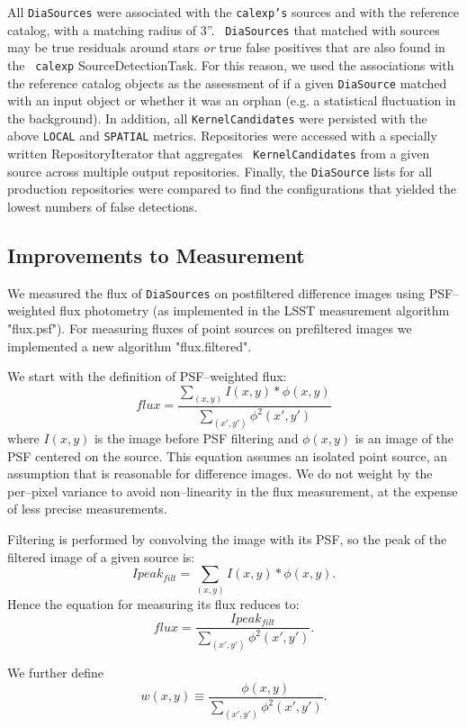 \documentclass[prd, nofootinbib, floatfix, 11pt,tightenlines,times]{article}
\begin{document}
All {\tt DiaSources} were associated with the {\tt calexp's} sources
and with the reference catalog, with a matching radius of 3''.  {\tt
  DiaSources} that matched with sources may be true residuals around
stars {\it or} true false positives that are also found in the {\tt
  calexp} SourceDetectionTask.  For this reason, we used the
associations with the reference catalog objects as the assessment of
if a given {\tt DiaSource} matched with an input object or whether it
was an orphan (e.g. a statistical fluctuation in the background).  In
addition, all {\tt KernelCandidates} were persisted with the above
{\tt LOCAL} and {\tt SPATIAL} metrics.  Repositories were accessed
with a specially written RepositoryIterator that aggregates {\tt
  KernelCandidates} from a given source across multiple output
repositories.  Finally, the {\tt DiaSource} lists for all production
repositories were compared to find the configurations that yielded the
lowest numbers of false detections.

\subsection{Improvements to Measurement \label{sec-meas}}

We measured the flux of {\tt DiaSources} on postfiltered difference images
using PSF--weighted flux photometry (as implemented in the LSST
measurement algorithm "flux.psf").  For measuring fluxes of point
sources on prefiltered images we implemented a new algorithm
"flux.filtered".

We start with the definition of PSF--weighted flux:
%
\[flux = \frac{\sum_{(x,y)}I(x,y) * \phi(x,y)}{\sum_{(x',y')}\phi^2(x',y')}\]
%
where $I(x,y)$ is the image before PSF filtering and $\phi(x,y)$ is an
image of the PSF centered on the source. This equation assumes an
isolated point source, an assumption that is reasonable for difference
images.  We do not weight by the per--pixel variance to avoid
non--linearity in the flux measurement, at the expense of less precise
measurements.

Filtering is performed by convolving the image with its PSF, so the
peak of the filtered image of a given source is:
%
\[Ipeak_{filt} = \sum_{(x,y)}I(x,y) * \phi(x,y).\]
%
Hence the equation for measuring its flux reduces to:
%
\[flux = \frac{Ipeak_{filt}}{\sum_{(x',y')}\phi^2(x',y')}.\]

We further define
%
\[w(x,y) \equiv \frac{\phi(x,y)}{\sum_{(x',y')}\phi^2(x',y')}.\]
\end{document}

